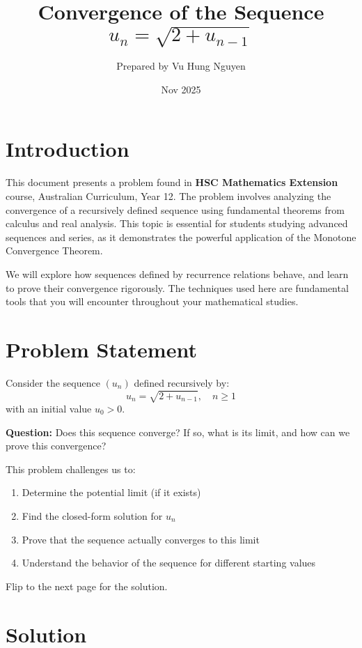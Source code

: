 \documentclass[12pt,a4paper]{article}
\title{Convergence of the Sequence $u_n = \sqrt{2 + u_{n-1}}$}
\author{Prepared by Vu Hung Nguyen}
\date{Nov 2025}
\theoremstyle{definition}
\begin{document}
\maketitle

\section{Introduction}

This document presents a problem found in \textbf{HSC Mathematics Extension} course, Australian Curriculum, Year 12. 
The problem involves analyzing the convergence of a recursively defined sequence using fundamental theorems 
from calculus and real analysis. 
This topic is essential for students studying advanced sequences and series, 
as it demonstrates the powerful application of the Monotone Convergence Theorem.

We will explore how sequences defined by recurrence relations behave, 
and learn to prove their convergence rigorously. 
The techniques used here are fundamental tools that you will encounter throughout your mathematical studies.

\section{Problem Statement}

Consider the sequence $(u_n)$ defined recursively by:
\begin{equation}
u_n = \sqrt{2 + u_{n-1}}, \quad n \geq 1
\end{equation}
with an initial value $u_0 > 0$.


\textbf{Question:} Does this sequence converge? If so, what is its limit, and how can we prove this convergence?

This problem challenges us to:
\begin{enumerate}[label=\roman*)]
    \item Determine the potential limit (if it exists)
    \item Find the closed-form solution for $u_n$
    \item Prove that the sequence actually converges to this limit
    \item Understand the behavior of the sequence for different starting values
\end{enumerate}

Flip to the next page for the solution.

\newpage

\section{Solution}
\end{document}
